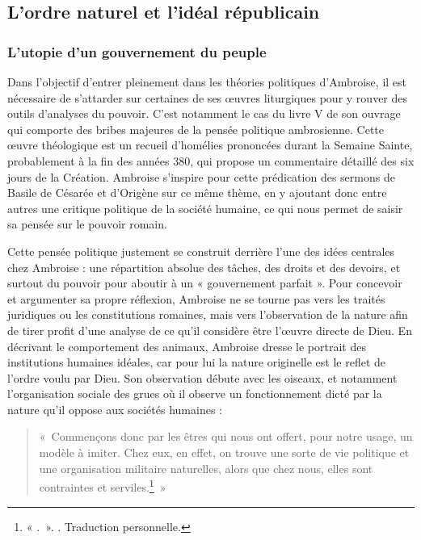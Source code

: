 \bigskip

\subsection{L'ordre naturel et l'idéal républicain}

\subsubsection{L'utopie d'un gouvernement du peuple}

Dans l'objectif d'entrer pleinement dans les théories politiques d'Ambroise, il est nécessaire de s'attarder sur certaines de ses œuvres liturgiques pour y rouver des outils d'analyses du pouvoir. C'est notamment le cas du livre V de son ouvrage  qui comporte des bribes majeures de la pensée politique ambrosienne. Cette œuvre théologique est un recueil d'homélies prononcées durant la Semaine Sainte, probablement à la fin des années 380, qui propose un commentaire détaillé des six jours de la Création. Ambroise s'inspire pour cette prédication des sermons de Basile de Césarée et d'Origène sur ce même thème\autocite[100-104]{fusco2025}, en y ajoutant donc entre autres une critique politique de la société humaine, ce qui nous permet de saisir sa pensée sur le pouvoir romain.

\bigskip

Cette pensée politique justement se construit derrière l'une des idées centrales chez Ambroise : une répartition absolue des tâches, des droits et des devoirs, et surtout du pouvoir pour aboutir à un « gouvernement parfait ». Pour concevoir et argumenter sa propre réflexion, Ambroise ne se tourne pas vers les traités juridiques ou les constitutions romaines, mais vers l'observation de la nature afin de tirer profit d'une analyse de ce qu'il considère être l'œuvre directe de Dieu. En décrivant le comportement des animaux, Ambroise dresse le portrait des institutions humaines idéales, car pour lui la nature originelle est le reflet de l'ordre voulu par Dieu. Son observation débute avec les oiseaux, et notamment l'organisation sociale des grues où il observe un fonctionnement dicté par la nature qu'il oppose aux sociétés humaines :

\bigskip

\begin{quote}
    «~Commençons donc par les êtres qui nous ont offert, pour notre usage, un modèle à imiter. Chez eux, en effet, on trouve une sorte de vie politique et une organisation militaire naturelles, alors que chez nous, elles sont contraintes et serviles.\footnote{« .~». \cite[\nopp V, 15, 50]{ambroise_csel_32_1}. Traduction personnelle.}~»
\end{quote}

